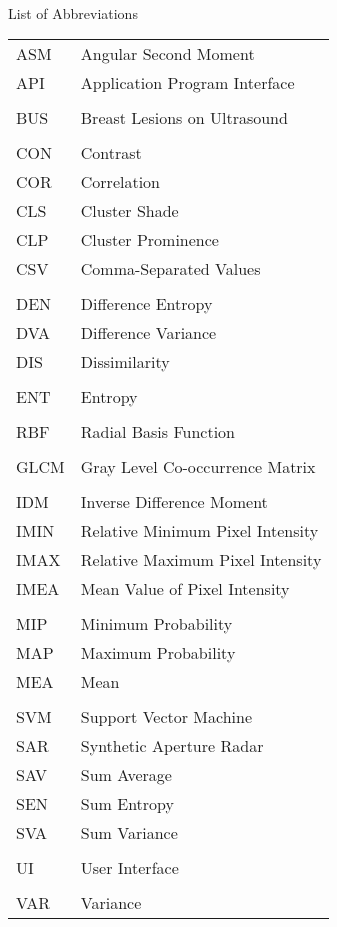 

\renewcommand{\baselinestretch}{1}
\small\normalsize
\hbox{\ }

\vspace{-4em}

\begin{center}
\large{List of Abbreviations}
\end{center} 

\vspace{3pt}

\begin{supertabular}{ll}
ASM & Angular Second Moment \\
API & Application Program Interface\\
\\
BUS & Breast Lesions on Ultrasound \\
\\
CON & Contrast \\
COR & Correlation \\
CLS & Cluster Shade \\
CLP & Cluster Prominence \\
CSV & Comma-Separated Values\\
\\
DEN & Difference Entropy \\
DVA & Difference Variance \\
DIS & Dissimilarity \\

\\
ENT & Entropy \\
\\
RBF & Radial Basis Function \\
\\
GLCM & Gray Level Co-occurrence Matrix\\
\\
IDM & Inverse Difference Moment \\
IMIN & Relative Minimum Pixel Intensity\\
IMAX & Relative Maximum Pixel Intensity\\
IMEA & Mean Value of Pixel Intensity\\
\\
MIP & Minimum Probability \\
MAP & Maximum Probability \\
MEA & Mean \\
\\
SVM & Support Vector Machine \\
SAR & Synthetic Aperture Radar\\
SAV & Sum Average \\
SEN & Sum Entropy \\
SVA & Sum Variance \\
\\
UI & User Interface \\
\\
VAR & Variance 

\end{supertabular}
